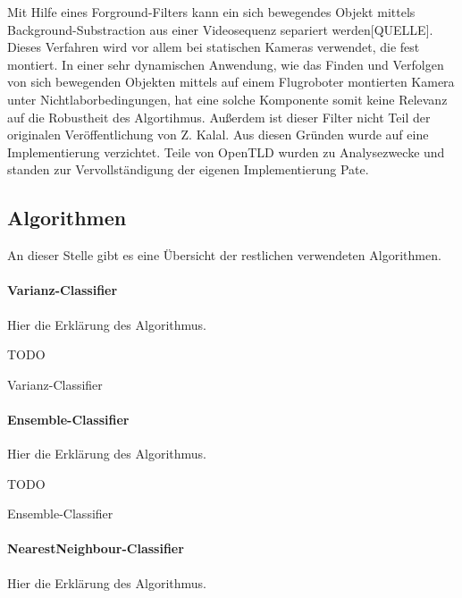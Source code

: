 Mit Hilfe eines Forground-Filters kann ein sich bewegendes Objekt mittels Background-Substraction aus einer Videosequenz separiert werden{[}QUELLE{]}. Dieses Verfahren wird vor allem bei statischen Kameras verwendet, die fest montiert. In einer sehr dynamischen Anwendung, wie das Finden und Verfolgen von sich bewegenden Objekten mittels auf einem Flugroboter montierten Kamera unter Nichtlaborbedingungen, hat eine solche Komponente somit keine Relevanz auf die Robustheit des Algortihmus. Außerdem ist dieser Filter nicht Teil der originalen Veröffentlichung von Z. Kalal. Aus diesen Gründen wurde auf eine Implementierung verzichtet. Teile von OpenTLD wurden zu Analysezwecke und standen zur Vervollständigung der eigenen Implementierung Pate.

\subsection*{Algorithmen}
An dieser Stelle gibt es eine Übersicht der restlichen verwendeten Algorithmen.

\paragraph{Varianz-Classifier}
Hier die Erklärung des Algorithmus.

\begin{algorithm}[H]
	\vspace{0.2cm}
	TODO
	\caption{Varianz-Classifier}
	\label{alg:varianz}
	\vspace{0.2cm}
\end{algorithm}

\paragraph{Ensemble-Classifier}
Hier die Erklärung des Algorithmus.

\begin{algorithm}[H]
	\vspace{0.2cm}
	TODO
	\caption{Ensemble-Classifier}
	\label{alg:ensemble}
	\vspace{0.2cm}
\end{algorithm}

\paragraph{NearestNeighbour-Classifier}
Hier die Erklärung des Algorithmus.

